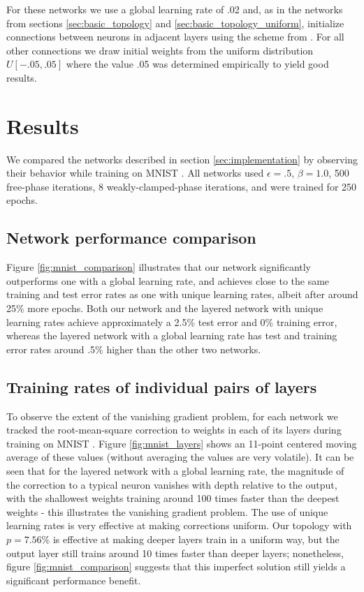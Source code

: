 \documentclass[utf8]{frontiersSCNS}
\begin{document}
For these networks we use a global learning rate of .02 and, as in the networks from sections \ref{sec:basic_topology} and \ref{sec:basic_topology_uniform}, initialize connections between neurons in adjacent layers using the scheme from \citep{glorot2010}. For all other connections we draw initial weights from the uniform distribution $U[-.05, .05]$ where the value .05 was determined empirically to yield good results.

\section{Results}

We compared the networks described in section \ref{sec:implementation} by observing their behavior while training on MNIST \citep{mnist1998}. All networks used $\epsilon=.5$, $\beta=1.0$, 500 free-phase iterations, 8 weakly-clamped-phase iterations, and were trained for 250 epochs.

\subsection{Network performance comparison}
\label{sec:network_performance}

Figure \ref{fig:mnist_comparison} illustrates that our network significantly outperforms one with a global learning rate, and achieves close to the same training and test error rates as one with unique learning rates, albeit after around 25\% more epochs. Both our network and the layered network with unique learning rates achieve approximately a 2.5\% test error and 0\% training error, whereas the layered network with a global learning rate has test and training error rates around .5\% higher than the other two networks.

\subsection{Training rates of individual pairs of layers}
\label{sec:mnist_perlayer}

To observe the extent of the vanishing gradient problem, for each network we tracked the root-mean-square correction to weights in each of its layers during training on MNIST \citep{mnist1998}. Figure \ref{fig:mnist_layers} shows an 11-point centered moving average of these values (without averaging the values are very volatile). It can be seen that for the layered network with a global learning rate, the magnitude of the correction to a typical neuron vanishes with depth relative to the output, with the shallowest weights training around 100 times faster than the deepest weights - this illustrates the vanishing gradient problem. The use of unique learning rates is very effective at making corrections uniform. Our topology with $p=7.56\%$ is effective at making deeper layers train in a uniform way, but the output layer still trains around 10 times faster than deeper layers; nonetheless, figure \ref{fig:mnist_comparison} suggests that this imperfect solution still yields a significant performance benefit.
\end{document}
